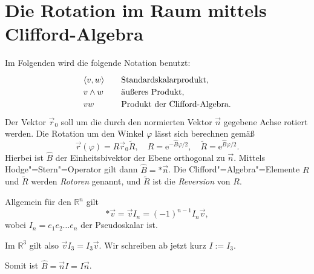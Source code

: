 \documentclass[a4paper,fleqn,11pt,dvipdfmx]{scrartcl}
\newcommand{\R}{\mathbb R}
\newcommand{\ee}{\mathrm e}
\begin{document}
\pagestyle{empty}

\section*{Die Rotation im Raum mittels Clifford-Algebra}

Im Folgenden wird die folgende Notation benutzt:
\[\def\arraystretch{1.2}
\begin{array}{ll}
\langle v,w\rangle &\quad \text{Standardskalarprodukt},\\
v\wedge w &\quad \text{äußeres Produkt},\\
vw &\quad \text{Produkt der Clifford-Algebra}.
\end{array}
\]
Der Vektor $\vec r_0$ soll um die durch den normierten Vektor $\vec n$
gegebene Achse rotiert werden. Die Rotation um den Winkel $\varphi$
lässt sich berechnen gemäß
\begin{equation}\label{eq:Rotation}
\vec r(\varphi) = R\vec r_0\tilde R,\quad R=\ee^{-\hat B\varphi/2},\quad\tilde R=\ee^{\hat B\varphi/2}.
\end{equation}
Hierbei ist $\hat B$ der Einheitsbivektor der Ebene orthogonal zu
$\vec n$. Mittels Hodge"=Stern"=Operator gilt dann $\hat B=*\vec n$.
Die Clifford"=Algebra"=Elemente $R$ und $\tilde R$
werden \emph{Rotoren} genannt, und $\tilde R$ ist die \emph{Reversion}
von $R$.

Allgemein für den $\R^n$ gilt
\begin{equation}\label{eq:Pseudoskalar-Vektor}
*\vec v = \vec vI_n = (-1)^{n-1}I_n\vec v,
\end{equation}
wobei $I_n = e_1e_2\ldots e_n$ der Pseudoskalar ist.

Im $\R^3$ gilt also $\vec vI_3=I_3\vec v$. Wir schreiben
ab jetzt kurz $I:=I_3$.

Somit ist $\hat B = \vec nI = I\vec n$.
\end{document}
